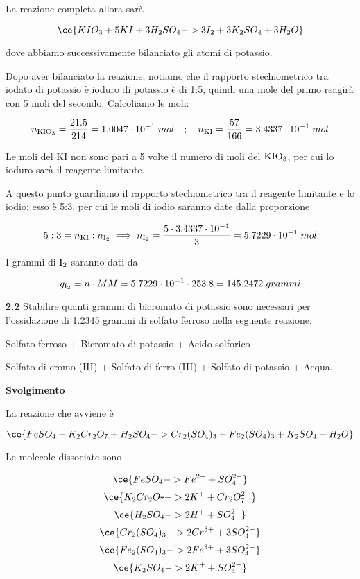 La reazione completa allora sarà

$$\ce{KIO_3 + 5KI + 3H_2SO_4 -> 3I_2 + 3K_2SO_4 + 3H_2O}$$

dove abbiamo successivamente bilanciato gli atomi di potassio.

Dopo aver bilanciato la reazione, notiamo che il rapporto stechiometrico tra iodato di potassio è ioduro di potassio è di 1:5, quindi una mole del primo reagirà con 5 moli del secondo. Calcoliamo le moli:

$$n_{\rm KIO_3}=\frac{21.5}{214}=1.0047 \cdot 10^{-1}\;mol
\quad;\quad
n_{\rm KI}=\frac{57}{166}=3.4337 \cdot 10^{-1}\;mol$$

Le moli del KI non sono pari a 5 volte il numero di moli del $\rm KIO_3$, per cui lo ioduro sarà il reagente limitante.

A questo punto guardiamo il rapporto stechiometrico tra il reagente limitante e lo iodio: esso è 5:3, per cui le moli di iodio saranno date dalla proporzione

$$5:3=n_{\rm KI}:n_{\rm I_2}
\implies
n_{\rm I_2}=\frac{5 \cdot 3.4337 \cdot 10^{-1}}{3}=5.7229 \cdot 10^{-1}\;mol$$

I grammi di $\rm I_2$ saranno dati da

$$g_{\rm I_2}=n \cdot MM
=5.7229 \cdot 10^{-1} \cdot 253.8
=145.2472\;grammi$$


\vspace{0.2cm}\textbf{2.2} Stabilire quanti grammi di bicromato di potassio sono necessari per l'ossidazione di 1.2345 grammi di solfato ferroso nella seguente reazione:

\begin{center}
    Solfato ferroso + Bicromato di potassio + Acido solforico \ce{->}
    
    \ce{->} Solfato di cromo (III) + Solfato di ferro (III) + Solfato di potassio + Acqua.   
\end{center}

\large\textbf{Svolgimento}\normalsize

\vspace{0.2cm}La reazione che avviene è

$$\ce{FeSO_4 + K_2Cr_2O_7 + H_2SO_4 -> Cr_2(SO_4)_3 + Fe_2(SO_4)_3 + K_2SO_4 + H_2O}$$

Le molecole dissociate sono

$$\ce{FeSO_4 -> Fe^{2+} + SO_4^{2-}}$$
$$\ce{K_2Cr_2O_7 -> 2K^+ + Cr_2O_7^{2-}}$$
$$\ce{H_2SO_4 -> 2H^+ + SO_4^{2-}}$$
$$\ce{Cr_2(SO_4)_3 -> 2Cr^{3+} + 3SO_4^{2-}}$$
$$\ce{Fe_2(SO_4)_3 -> 2Fe^{3+} + 3SO_4^{2-}}$$
$$\ce{K_2SO_4 -> 2K^+ + SO_4^{2-}}$$

